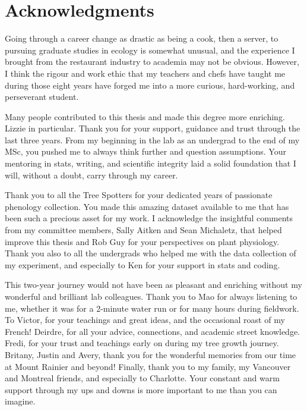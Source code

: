 
\chapter{Acknowledgments}
Going through a career change as drastic as being a cook, then a server, to pursuing graduate studies in ecology is somewhat unusual, and the experience I brought from the restaurant industry to academia may not be obvious. However, I think the rigour and work ethic that my teachers and chefs have taught me during those eight years have forged me into a more curious, hard-working, and perseverant student. 

Many people contributed to this thesis and made this degree more enriching. Lizzie in particular. Thank you for your support, guidance and trust through the last three years. From my beginning in the lab as an undergrad to the end of my MSc, you pushed me to always think further and question assumptions. Your mentoring in stats, writing, and scientific integrity laid a solid foundation that I will, without a doubt, carry through my career.

Thank you to all the Tree Spotters for your dedicated years of passionate phenology collection. You made this amazing dataset available to me that has been such a precious asset for my work. I acknowledge the insightful comments from my committee members, Sally Aitken and Sean Michaletz, that helped improve this thesis and Rob Guy for your perspectives on plant physiology. Thank you also to all the undergrads who helped me with the data collection of my experiment, and especially to Ken for your support in stats and coding.

This two-year journey would not have been as pleasant and enriching without my wonderful and brilliant lab colleagues. Thank you to Mao for always listening to me, whether it was for a 2-minute water run or for many hours during fieldwork. To Victor, for your teachings and great ideas, and the occasional roast of my French! Deirdre, for all your advice, connections, and academic street knowledge. Fredi, for your trust and teachings early on during my tree growth journey. Britany, Justin and Avery, thank you for the wonderful memories from our time at Mount Rainier and beyond! Finally, thank you to my family, my Vancouver and Montreal friends, and especially to Charlotte. Your constant and warm support through my ups and downs is more important to me than you can imagine. 